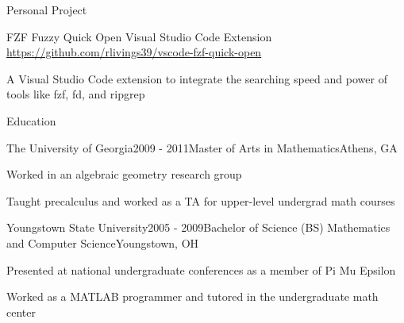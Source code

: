 \documentclass[
	usletter %
	10pt, %
]{resume} %
\begin{document}

\begin{rSection}{Personal Project}

\begin{rSubsection}{FZF Fuzzy Quick Open Visual Studio Code Extension\\ \url{https://github.com/rlivings39/vscode-fzf-quick-open}}{}{}{}
	\item A Visual Studio Code extension to integrate the searching speed and power of tools like fzf, fd, and ripgrep
\end{rSubsection}
\end{rSection}




\begin{rSection}{Education}
	\begin{rSubsection}{The University of Georgia}{2009 - 2011}{Master of Arts in Mathematics}{Athens, GA}
		\item Worked in an algebraic geometry research group
		\item Taught precalculus and worked as a TA for upper-level undergrad math courses
	\end{rSubsection}
	\begin{rSubsection}{Youngstown State University}{2005 - 2009}{Bachelor of Science (BS) Mathematics and Computer Science}{Youngstown, OH}
		\item Presented at national undergraduate conferences as a member of Pi Mu Epsilon
		\item Worked as a MATLAB programmer and tutored in the undergraduate math center
	\end{rSubsection}

\end{rSection}
\end{document}
